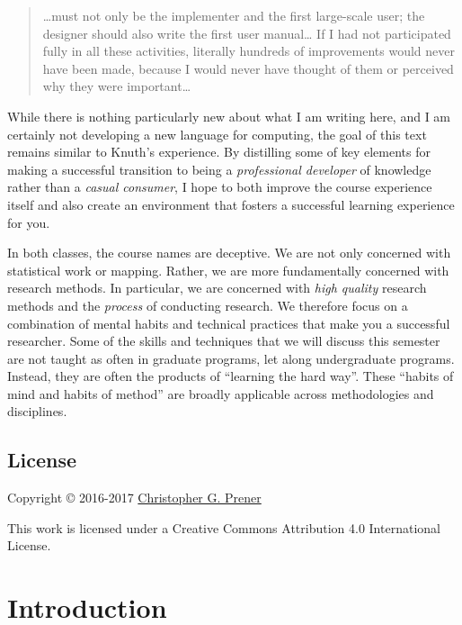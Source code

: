 \documentclass[]{book}
\theoremstyle{definition}
\theoremstyle{definition}
\theoremstyle{definition}
\theoremstyle{remark}
\begin{document}
\begin{quote}
\ldots{}must not only be the implementer and the first large-scale user;
the designer should also write the first user manual\ldots{} If I had
not participated fully in all these activities, literally hundreds of
improvements would never have been made, because I would never have
thought of them or perceived why they were important\ldots{}
\end{quote}

While there is nothing particularly new about what I am writing here,
and I am certainly not developing a new language for computing, the goal
of this text remains similar to Knuth's experience. By distilling some
of key elements for making a successful transition to being a
\emph{professional developer} of knowledge rather than a \emph{casual
consumer}, I hope to both improve the course experience itself and also
create an environment that fosters a successful learning experience for
you.

In both classes, the course names are deceptive. We are not only
concerned with statistical work or mapping. Rather, we are more
fundamentally concerned with research methods. In particular, we are
concerned with \emph{high quality} research methods and the
\emph{process} of conducting research. We therefore focus on a
combination of mental habits and technical practices that make you a
successful researcher. Some of the skills and techniques that we will
discuss this semester are not taught as often in graduate programs, let
along undergraduate programs. Instead, they are often the products of
``learning the hard way''. These ``habits of mind and habits of method''
are broadly applicable across methodologies and disciplines.

\section*{License}\label{license}

Copyright © 2016-2017 \href{https://chris-prener.github.io}{Christopher
G. Prener}

This work is licensed under a Creative Commons Attribution 4.0
International License.

\chapter{Introduction}\label{intro}
\end{document}
